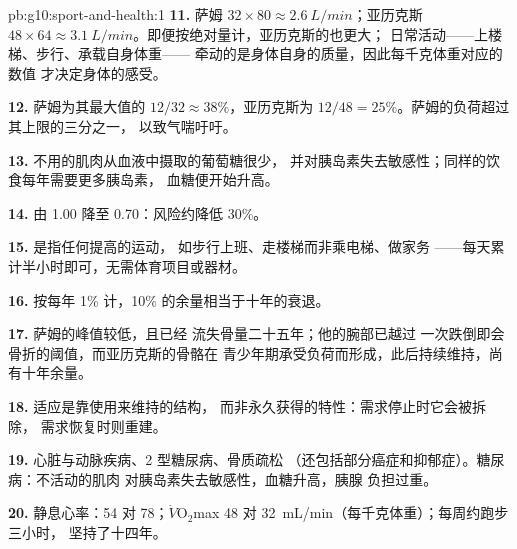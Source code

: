 \begin{solution}{pb:g10:sport-and-health:1}
\textbf{11.} 萨姆 $32 \times 80 \approx \qty{2.6}{L/min}$；亚历克斯 $48
\times 64 \approx \qty{3.1}{L/min}$。即便按绝对量计，亚历克斯的也更大；
日常活动——上楼梯、步行、承载自身体重——
牵动的是身体自身的质量，因此每千克体重对应的数值
才决定身体的感受。

\textbf{12.} 萨姆为其最大值的 $12/32 \approx 38\%$，亚历克斯为 $12/48 =
25\%$。萨姆的负荷超过其上限的三分之一，
以致气喘吁吁。

\textbf{13.} 不用的肌肉从血液中摄取的葡萄糖很少，
并对胰岛素失去敏感性；同样的饮食每年需要更多胰岛素，
血糖便开始升高。

\textbf{14.} 由 1.00 降至 0.70：风险约降低 30\%。

\textbf{15.} 是指任何提高的运动，
如步行上班、走楼梯而非乘电梯、做家务
——每天累计半小时即可，无需体育项目或器材。

\textbf{16.} 按每年 1\% 计，10\% 的余量相当于十年的衰退。

\textbf{17.} 萨姆的峰值较低，且已经
流失骨量二十五年；他的腕部已越过
一次跌倒即会骨折的阈值，而亚历克斯的骨骼在
青少年期承受负荷而形成，此后持续维持，尚有十年余量。

\textbf{18.} 适应是靠使用来维持的结构，
而非永久获得的特性：需求停止时它会被拆除，
需求恢复时则重建。

\textbf{19.} 心脏与动脉疾病、2 型糖尿病、骨质疏松
（还包括部分癌症和抑郁症）。糖尿病：不活动的肌肉
对胰岛素失去敏感性，血糖升高，胰腺
负担过重。

\textbf{20.} 静息心率：54 对 78；$\dot V\!\mathrm{O_2}$max
\num{48} 对 \qty{32}{mL/min}（每千克体重）；每周约跑步三小时，
坚持了十四年。
\end{solution}

